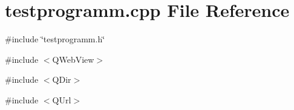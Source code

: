\section{testprogramm.cpp File Reference}
\label{testprogramm_8cpp}
{\ttfamily \#include \char`\"{}testprogramm.h\char`\"{}}\par
{\ttfamily \#include $<$QWebView$>$}\par
{\ttfamily \#include $<$QDir$>$}\par
{\ttfamily \#include $<$QUrl$>$}\par
